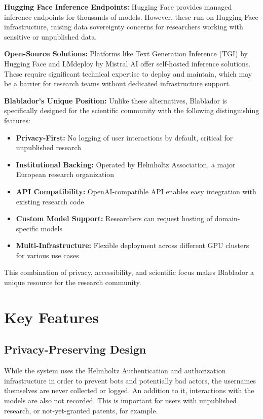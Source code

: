 \documentclass[10pt,conference]{IEEEtran}
\begin{document}
\textbf{Hugging Face Inference Endpoints:} Hugging Face provides managed inference endpoints for thousands of models. However, these run on Hugging Face infrastructure, raising data sovereignty concerns for researchers working with sensitive or unpublished data.

\textbf{Open-Source Solutions:} Platforms like Text Generation Inference (TGI) by Hugging Face and LMdeploy by Mistral AI offer self-hosted inference solutions. These require significant technical expertise to deploy and maintain, which may be a barrier for research teams without dedicated infrastructure support.

\textbf{Blablador's Unique Position:} Unlike these alternatives, Blablador is specifically designed for the scientific community with the following distinguishing features:

\begin{itemize}
    \item \textbf{Privacy-First:} No logging of user interactions by default, critical for unpublished research
    \item \textbf{Institutional Backing:} Operated by Helmholtz Association, a major European research organization
    \item \textbf{API Compatibility:} OpenAI-compatible API enables easy integration with existing research code
    \item \textbf{Custom Model Support:} Researchers can request hosting of domain-specific models
    \item \textbf{Multi-Infrastructure:} Flexible deployment across different GPU clusters for various use cases
\end{itemize}

This combination of privacy, accessibility, and scientific focus makes Blablador a unique resource for the research community.

\section{Key Features}
\subsection{Privacy-Preserving Design}
While the system uses the Helmholtz Authentication and authorization infrastructure in order to prevent bots and potentially bad actors, the usernames themselves are never collected or logged. An addition to it, interactions with the models are also not recorded.
This is important for users with unpublished research, or not-yet-granted patents, for example.
\end{document}
